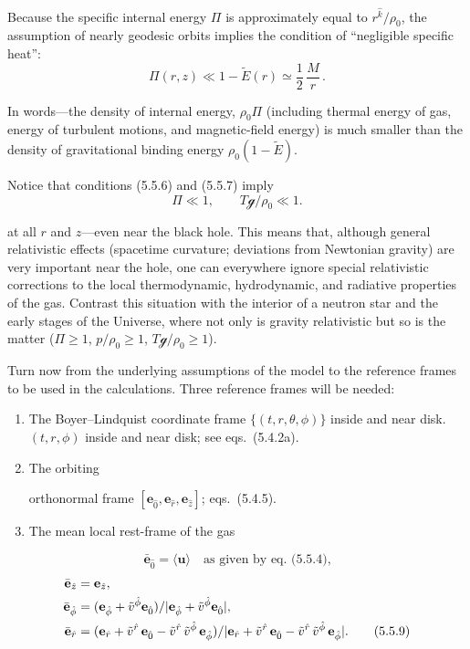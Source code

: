 Because the specific internal energy $\Pi$ is approximately equal to
$r^{\hat{k}}\!/\rho_0$, the assumption of nearly geodesic orbits implies the condition
of ``negligible specific heat'':
\begin{equation}
\Pi(r,z) \ll 1 - \tilde{E}(r) \simeq \frac{1}{2}\,\frac{M}{r}\,.
\tag{5.5.7}
\end{equation}

In words---the density of internal energy, $\rho_0\Pi$ (including thermal
energy of gas, energy of turbulent motions, and magnetic-field energy)
is much smaller than the density of gravitational binding energy
$\rho_0(1-\tilde{E})$.

Notice that conditions (5.5.6) and (5.5.7) imply
\begin{equation}
\Pi \ll 1, \qquad T\mathscr{g}/\rho_0 \ll 1.
\tag{5.5.8}
\end{equation}

at all $r$ and $z$---even near the black hole.  This means that, although
general relativistic effects (spacetime curvature; deviations from
Newtonian gravity) are very important near the hole, one can everywhere
ignore special relativistic corrections to the local thermodynamic,
hydrodynamic, and radiative properties of the gas.  Contrast this
situation with the interior of a neutron star and the early stages of the
Universe, where not only is gravity relativistic but so is the matter
($\Pi \geq 1$, $p/\rho_0 \geq 1$, $T\mathscr{g}/\rho_0 \geq 1$).

Turn now from the underlying assumptions of the model to the reference
frames to be used in the calculations.  Three reference frames will be needed:
\begin{enumerate}
\item[(i)] The Boyer--Lindquist coordinate frame $\{(t,r,\theta,\phi)\}$ inside and near disk.
$(t,r,\phi)$ inside and near disk;
see eqs.\ (5.4.2a).
\item[(ii)] The orbiting

orthonormal frame $[\mathbf{e}_{\hat{0}}, \mathbf{e}_{\hat{r}}, \mathbf{e}_{\hat{z}}]$; eqs.\ (5.4.5).
\item[(iii)] The mean local rest-frame of the gas
\end{enumerate}

\begin{equation}
\bar{\mathbf{e}}_{\hat{0}} = \langle \mathbf{u} \rangle \quad \text{as given by eq.\ (5.5.4),}
\tag{5.5.9}
\end{equation}
\begin{align}
\bar{\mathbf{e}}_{\hat{z}} &= \mathbf{e}_{\hat{z}}, \notag\\
\bar{\mathbf{e}}_{\hat{\phi}} &= (\mathbf{e}_{\hat{\phi}} + \tilde{v}^{\hat{\phi}}\mathbf{e}_{\hat{0}})/
|\mathbf{e}_{\hat{\phi}} + \tilde{v}^{\hat{\phi}}\mathbf{e}_{\hat{0}}|, \notag\\
\bar{\mathbf{e}}_{\hat{r}} &= (\mathbf{e}_{\hat{r}} + \tilde{v}^{\hat{r}}\,\mathbf{e}_{\hat{0}}
- \tilde{v}^{\hat{r}}\,\tilde{v}^{\hat{\phi}}\,\mathbf{e}_{\hat{\phi}})
/|\mathbf{e}_{\hat{r}} + \tilde{v}^{\hat{r}}\,\mathbf{e}_{\hat{0}} - \tilde{v}^{\hat{r}}\,\tilde{v}^{\hat{\phi}}\,\mathbf{e}_{\hat{\phi}}|.
\tag{5.5.9}
\end{align}

